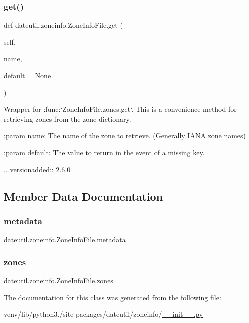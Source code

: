 \subsubsection{\texorpdfstring{get()}{get()}}
{\footnotesize\ttfamily def dateutil.\+zoneinfo.\+Zone\+Info\+File.\+get (\begin{DoxyParamCaption}\item[{}]{self,  }\item[{}]{name,  }\item[{}]{default = {\ttfamily None} }\end{DoxyParamCaption})}

\begin{DoxyVerb}Wrapper for :func:`ZoneInfoFile.zones.get`. This is a convenience method
for retrieving zones from the zone dictionary.

:param name:
    The name of the zone to retrieve. (Generally IANA zone names)

:param default:
    The value to return in the event of a missing key.

.. versionadded:: 2.6.0\end{DoxyVerb}
 

\subsection{Member Data Documentation}
\mbox{\label{classdateutil_1_1zoneinfo_1_1ZoneInfoFile_a31d874eb36efd8f25ff8bb4ce5a9795b}} 
\subsubsection{\texorpdfstring{metadata}{metadata}}
{\footnotesize\ttfamily dateutil.\+zoneinfo.\+Zone\+Info\+File.\+metadata}

\mbox{\label{classdateutil_1_1zoneinfo_1_1ZoneInfoFile_a61a09803c570d7fa7d2e34211a962896}} 
\subsubsection{\texorpdfstring{zones}{zones}}
{\footnotesize\ttfamily dateutil.\+zoneinfo.\+Zone\+Info\+File.\+zones}



The documentation for this class was generated from the following file\+:\begin{DoxyCompactItemize}
\item 
venv/lib/python3./site-\/packages/dateutil/zoneinfo/\hyperlink{venv_2lib_2python3_89_2site-packages_2dateutil_2zoneinfo_2____init_____8py}{\+\_\+\+\_\+init\+\_\+\+\_\+.\+py}\end{DoxyCompactItemize}
